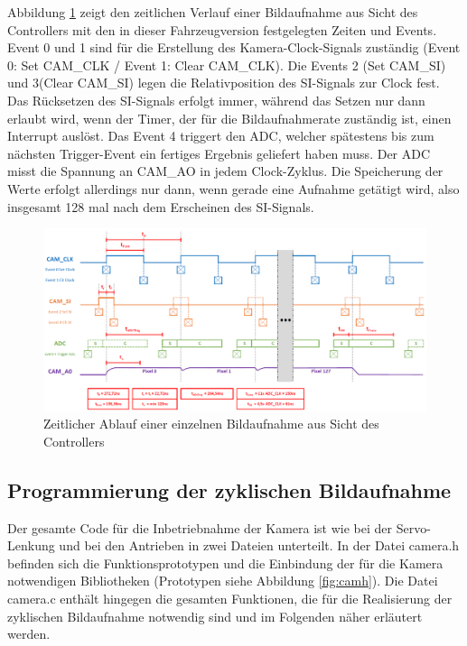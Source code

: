 Abbildung \ref{fig:CAMProcedure} zeigt den zeitlichen Verlauf einer Bildaufnahme aus Sicht des Controllers mit den in dieser Fahrzeugversion festgelegten Zeiten und Events. Event 0 und 1 sind für die Erstellung des Kamera-Clock-Signals zuständig (Event 0: Set CAM\_CLK / Event 1: Clear CAM\_CLK). Die Events 2 (Set CAM\_SI) und 3(Clear CAM\_SI) legen die Relativposition des SI-Signals zur Clock fest. Das Rücksetzen des SI-Signals erfolgt immer, während das Setzen nur dann erlaubt wird, wenn der Timer, der für die Bildaufnahmerate zuständig ist, einen Interrupt auslöst. Das Event 4 triggert den ADC, welcher spätestens bis zum nächsten Trigger-Event ein fertiges Ergebnis geliefert haben muss. Der ADC misst die Spannung an CAM\_AO in jedem Clock-Zyklus. Die Speicherung der Werte erfolgt allerdings nur dann, wenn gerade eine Aufnahme getätigt wird, also insgesamt 128 mal nach dem Erscheinen des SI-Signals.

\begin{figure}[H] %
\includegraphics[width=\textwidth]{sec7/images/CAMProcedure} 
\centering
\captionsetup{width=.95\textwidth}
\caption[Zeitlicher Ablauf einer einzelnen Bildaufnahme aus Sicht des Controllers]{Zeitlicher Ablauf einer einzelnen Bildaufnahme aus Sicht des Controllers}\centering
\label{fig:CAMProcedure}
\end{figure}

\newpage

\subsection{Programmierung der zyklischen Bildaufnahme}\label{Sec7Sub3}

Der gesamte Code für die Inbetriebnahme der Kamera ist wie bei der Servo-Lenkung und bei den Antrieben in zwei Dateien unterteilt. In der Datei \glqq{}camera.h\grqq{} befinden sich die Funktionsprototypen und die Einbindung der für die Kamera notwendigen Bibliotheken (Prototypen siehe Abbildung \ref{fig:camh}). Die Datei \glqq{}camera.c\grqq{} enthält hingegen die gesamten Funktionen, die für die Realisierung der zyklischen Bildaufnahme notwendig sind und im Folgenden näher erläutert werden.

